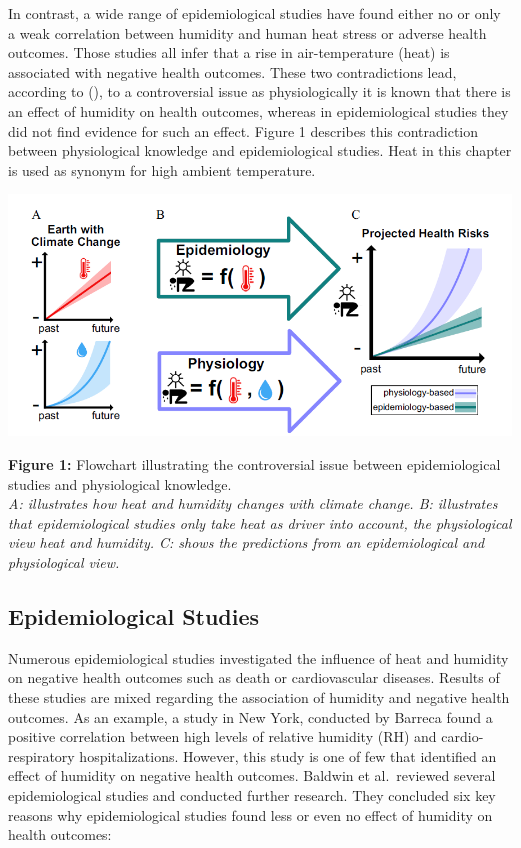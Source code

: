 \documentclass[
]{krantz}
\begin{document}
In contrast, a wide range of epidemiological studies have found either no or only a weak correlation between humidity and human heat stress or adverse health outcomes. Those studies all infer that a rise in air-temperature (heat) is associated with negative health outcomes. These two contradictions lead, according to (\citet{baldwin2023}), to a controversial issue as physiologically it is known that there is an effect of humidity on health outcomes, whereas in epidemiological studies they did not find evidence for such an effect. Figure 1 describes this contradiction between physiological knowledge and epidemiological studies. Heat in this chapter is used as synonym for high ambient temperature.

\begin{center}\includegraphics[width=0.8\linewidth]{Controversial Issue} \end{center}

\textbf{Figure 1:} Flowchart illustrating the controversial issue between epidemiological studies and physiological knowledge.\\
\emph{A: illustrates how heat and humidity changes with climate change. B: illustrates that epidemiological studies only take heat as driver into account, the physiological view heat and humidity. C: shows the predictions from an epidemiological and physiological view.}

\subsection{Epidemiological Studies}\label{epidemiological-studies}

Numerous epidemiological studies investigated the influence of heat and humidity on negative health outcomes such as death or cardiovascular diseases. Results of these studies are mixed regarding the association of humidity and negative health outcomes. As an example, a study in New York, conducted by Barreca found a positive correlation between high levels of relative humidity (RH) and cardio-respiratory hospitalizations. However, this study is one of few that identified an effect of humidity on negative health outcomes.
Baldwin et al.~reviewed several epidemiological studies and conducted further research. They concluded six key reasons why epidemiological studies found less or even no effect of humidity on health outcomes:
\end{document}
